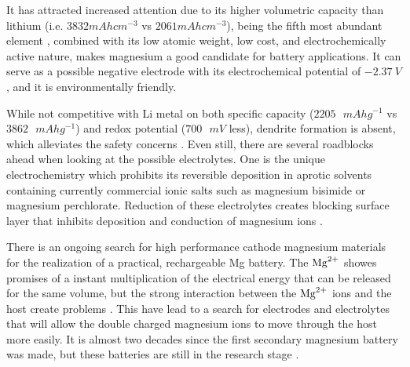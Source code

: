 	It has attracted increased attention due to its higher volumetric capacity than lithium (i.e. $3832 \si{mAh cm^{-3}}$ vs $2061 \si{mAh cm^{-3}}$), being the fifth most abundant element \cite{muldoon2012electrolyte}, combined with its low atomic weight, low cost, and electrochemically active nature, makes magnesium a good candidate for battery applications. It can serve as a possible negative electrode with its electrochemical potential of $\SI{-2.37}{V}$, and it is environmentally friendly. 

	 While not competitive with Li metal on both specific capacity ($2205\text{ } \si{mAh g^{-1}}$ vs $3862\text{ } \si{mAh g^{-1}}$) and redox potential ($700\text{ }\si{mV}$ less), dendrite formation is absent, which alleviates the safety concerns \cite{aurbach2003nonaqueous}. Even still, there are several roadblocks ahead when looking at the possible electrolytes. One is the unique electrochemistry which prohibits its reversible deposition in aprotic solvents containing currently commercial ionic salts such as magnesium bisimide or magnesium perchlorate. Reduction of these electrolytes creates blocking surface layer that inhibits deposition and conduction of magnesium ions \cite{aurbach2001comparison} \cite{gnanaraj2003improving}.
	
	There is an ongoing search for high performance cathode magnesium materials for the realization of a practical, rechargeable Mg battery. The $\ce{Mg^2+}$ showes promises of a instant multiplication of the electrical energy that can be released for the same volume, but the strong interaction between the $\ce{Mg^2+}$ ions and the host create problems \cite{van2014rechargeable}. This have lead to a search for electrodes and electrolytes that will allow the double charged magnesium ions to move through the host more easily. It is almost two decades since the first secondary magnesium battery was made, but these batteries are still in the research stage \cite{attias2019anode}.
 




